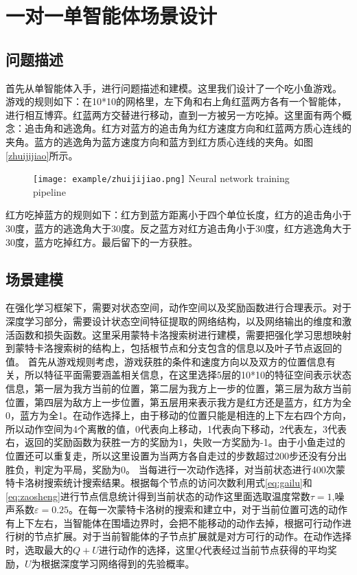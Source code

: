 \section{一对一单智能体场景设计}
\subsection{问题描述}
首先从单智能体入手，进行问题描述和建模。这里我们设计了一个吃小鱼游戏。
游戏的规则如下：在10*10的网格里，左下角和右上角红蓝两方各有一个智能体，进行相互博弈。红蓝两方交替进行移动，直到一方被另一方吃掉。这里面有两个概念：追击角和逃逸角。红方对蓝方的追击角为红方速度方向和红蓝两方质心连线的夹角。蓝方的逃逸角为蓝方速度方向和蓝方到红方质心连线的夹角。如图\ref{zhuijijiao}所示。
\begin{figure}[!htp]
	\centering
	\texttt{[image: example/zhuijijiao.png]}
	{Neural network training pipeline}
	\label{fig:zhuijijiao}
\end{figure}
红方吃掉蓝方的规则如下：红方到蓝方距离小于四个单位长度，红方的追击角小于30度，蓝方的逃逸角大于30度。反之蓝方对红方追击角小于30度，红方逃逸角大于30度，蓝方吃掉红方。最后留下的一方获胜。
\subsection{场景建模}
在强化学习框架下，需要对状态空间，动作空间以及奖励函数进行合理表示。对于深度学习部分，需要设计状态空间特征提取的网络结构，以及网络输出的维度和激活函数和损失函数。这里采用蒙特卡洛搜索树进行建模，需要把强化学习思想映射到蒙特卡洛搜索树的结构上，包括根节点和分支包含的信息以及叶子节点返回的值。
首先从游戏规则考虑，游戏获胜的条件和速度方向以及双方的位置信息有关，所以特征平面需要涵盖相关信息，在这里选择5层的10*10的特征空间表示状态信息，第一层为我方当前的位置，第二层为我方上一步的位置，第三层为敌方当前位置，第四层为敌方上一步位置，第五层用来表示我方是红方还是蓝方，红方为全0，蓝方为全1。在动作选择上，由于移动的位置只能是相连的上下左右四个方向，所以动作空间为4个离散的值，0代表向上移动，1代表向下移动，2代表左，3代表右，返回的奖励函数为获胜一方的奖励为1，失败一方奖励为-1。由于小鱼走过的位置还可以重复走，所以这里设置为当两方各自走过的步数超过200步还没有分出胜负，判定为平局，奖励为0。
当每进行一次动作选择，对当前状态进行400次蒙特卡洛树搜索统计搜索结果。根据每个节点的访问次数利用式\ref{eq:gailu}和\ref{eq:zaosheng}进行节点信息统计得到当前状态的动作这里面选取温度常数$\tau=1$,噪声系数$\varepsilon=0.25$。在每一次蒙特卡洛树的搜索和建立中，对于当前位置可选的动作有上下左右，当智能体在围墙边界时，会把不能移动的动作去掉，根据可行动作进行树的节点扩展。对于当前智能体的子节点扩展就是对方可行的动作。在动作选择时，选取最大的$Q+U$进行动作的选择，这里$Q$代表经过当前节点获得的平均奖励，$U$为根据深度学习网络得到的先验概率。



